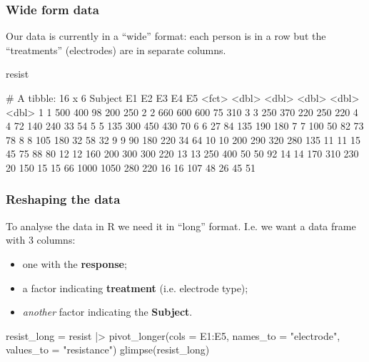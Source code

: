 \documentclass[a4paper]{article}\usepackage[]{graphicx}\usepackage[]{xcolor}
\begin{document}
\subsubsection{Wide form data}
Our data is currently in a ``wide'' format: each person is in a row but the ``treatments'' (electrodes) are in separate columns.
\begin{Schunk}
\begin{Sinput}
resist
\end{Sinput}
\begin{Soutput}
# A tibble: 16 x 6
   Subject    E1    E2    E3    E4    E5
   <fct>   <dbl> <dbl> <dbl> <dbl> <dbl>
 1 1         500   400    98   200   250
 2 2         660   600   600    75   310
 3 3         250   370   220   250   220
 4 4          72   140   240    33    54
 5 5         135   300   450   430    70
 6 6          27    84   135   190   180
 7 7         100    50    82    73    78
 8 8         105   180    32    58    32
 9 9          90   180   220    34    64
10 10        200   290   320   280   135
11 11         15    45    75    88    80
12 12        160   200   300   300   220
13 13        250   400    50    50    92
14 14        170   310   230    20   150
15 15         66  1000  1050   280   220
16 16        107    48    26    45    51
\end{Soutput}
\end{Schunk}
\subsubsection{Reshaping the data}
To analyse the data in R we need it in ``long'' format. I.e. we want a data frame with 3 columns:
\begin{itemize}
	\item one with the \textbf{response};
	\item a factor indicating \textcolor{mygreen}{\textbf{treatment}} (i.e. electrode type);
	\item \textit{another} factor indicating the \textcolor{myred}{\textbf{Subject}}.
\end{itemize}
\begin{Schunk}
\begin{Sinput}
resist_long = resist |> 
  pivot_longer(cols = E1:E5, 
               names_to = "electrode", 
               values_to = "resistance")
glimpse(resist_long)
\end{Sinput}
\end{Schunk}
\end{document}
